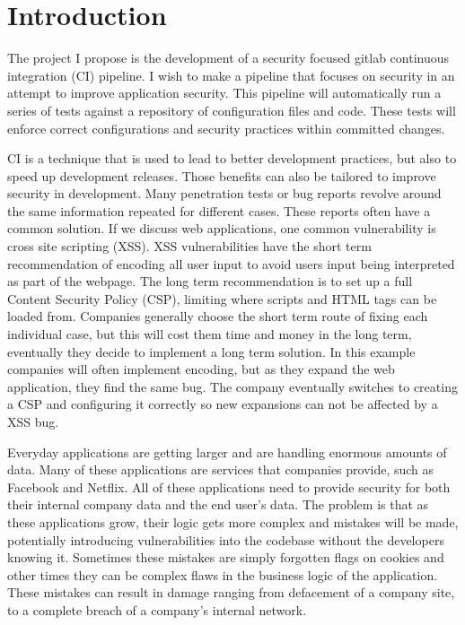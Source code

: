 \section{Introduction}
    The project I propose is the development of a security focused gitlab continuous integration (CI) pipeline. I wish to make a pipeline that focuses on security in an attempt to improve application 
    security. This pipeline will automatically run a series of tests against a repository of configuration files and code. These tests will enforce correct configurations and security practices within
    committed changes.

    CI is a technique that is used to lead to better development practices, but also to speed up development releases. Those benefits can also be tailored to improve security in 
    development. Many penetration tests or bug reports revolve around the same information repeated for different cases. These reports often have a common solution. If we discuss web applications, one 
    common vulnerability is cross site scripting (XSS). XSS vulnerabilities have the short term recommendation of encoding all user input to avoid users input being interpreted as part of the webpage. 
    The long term recommendation is to set up a full Content Security Policy (CSP), limiting where scripts and HTML tags can be loaded from. Companies generally choose the short term route of fixing 
    each individual case, but this will cost them time and money in the long term, eventually they decide to implement a long term solution. In this example companies will often implement encoding, 
    but as they expand the web application, they find the same bug. The company eventually switches to creating a CSP and configuring it correctly so new expansions can not be affected by a XSS bug.
    
    Everyday applications are getting larger and are handling enormous amounts of data. Many of these applications are services that companies provide, such as Facebook and Netflix. All of these 
    applications need to provide security for both their internal company data and the end user's data. The problem is that as these applications grow, their logic gets more complex and mistakes will 
    be made, potentially introducing vulnerabilities into the codebase without the developers knowing it. Sometimes these mistakes are simply forgotten flags on cookies and other times they can be 
    complex flaws in the business logic of the application. These mistakes can result in damage ranging from defacement of a company site, to a complete breach of a company's internal network.

